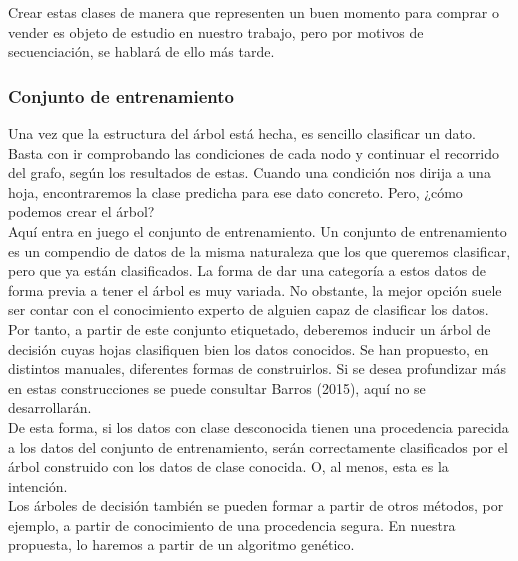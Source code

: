 			Crear estas clases de manera que representen un buen momento para comprar o vender es objeto de estudio en nuestro trabajo, pero por motivos de secuenciaci\'on, se hablar\'a de ello m\'as tarde.\\
			
			\subsubsection{Conjunto de entrenamiento}
			Una vez que la estructura del \'arbol est\'a hecha, es sencillo clasificar un dato. Basta con ir comprobando las condiciones de cada nodo y continuar el recorrido del grafo, seg\'un los resultados de estas. Cuando una condici\'on nos dirija a una hoja, encontraremos la clase predicha para ese dato concreto. Pero, ¿c\'omo podemos crear el \'arbol?\\
			
			Aqu\'i entra en juego el conjunto de entrenamiento. Un conjunto de entrenamiento es un compendio de datos de la misma naturaleza que los que queremos clasificar, pero que ya est\'an clasificados. La forma de dar una categor\'ia a estos datos de forma previa a tener el \'arbol es muy variada. No obstante, la mejor opci\'on suele ser contar con el conocimiento experto de alguien capaz de clasificar los datos.\\
			
			Por tanto, a partir de este conjunto etiquetado, deberemos inducir un \'arbol de decisi\'on cuyas hojas clasifiquen bien los datos conocidos. Se han propuesto, en distintos manuales, diferentes formas de construirlos. Si se desea profundizar m\'as en estas construcciones se puede consultar Barros (2015), aqu\'i no se desarrollar\'an.\\
			
			De esta forma, si los datos con clase desconocida tienen una procedencia parecida a los datos del conjunto de entrenamiento, ser\'an correctamente clasificados por el \'arbol construido con los datos de clase conocida. O, al menos, esta es la intenci\'on.\\
			
			Los \'arboles de decisi\'on tambi\'en se pueden formar a partir de otros m\'etodos, por ejemplo, a partir de conocimiento de una procedencia segura. En nuestra propuesta, lo haremos a partir de un algoritmo gen\'etico.\\
	
